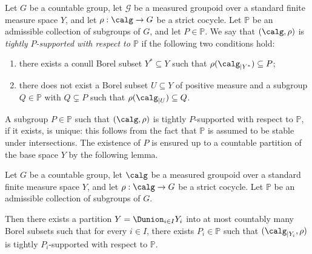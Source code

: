 \begin{de}
Let $G$ be a countable group, let $\mathcal{G}$ be a measured groupoid over a standard finite measure space $Y$, and let $\rho:\calg\to G$ be a strict cocycle. Let $\mathbb{P}$ be an admissible collection of subgroups of $G$, and let $P\in\mathbb{P}$. We say that $(\calg,\rho)$ is \emph{tightly $P$-supported with respect to $\mathbb{P}$} if the following two conditions hold:
\begin{enumerate}
\item there exists a conull Borel subset $Y^*\subseteq Y$ such that $\rho(\calg_{|Y^*})\subseteq P$;
\item there does not exist a Borel subset $U\subseteq Y$ of positive measure and a subgroup $Q\in\mathbb{P}$ with $Q\subsetneq P$ such that $\rho(\calg_{|U})\subseteq Q$.
\end{enumerate}
\end{de}

A subgroup $P\in\mathbb{P}$ such that $(\calg,\rho)$ is tightly $P$-supported with respect to $\mathbb{P}$, if it exists, is unique: this follows from the fact that $\mathbb{P}$ is assumed to be stable under intersections. The existence of $P$ is ensured up to a countable partition of the base space $Y$ by the following lemma.

\begin{lemma}\label{lemma:support}
Let $G$ be a countable group, let $\calg$ be a measured groupoid over a standard finite measure space $Y$, and let $\rho:\calg\to G$ be a strict cocycle. Let $\mathbb{P}$ be an admissible collection of subgroups of $G$.

Then there exists a partition $Y=\Dunion_{i\in I}Y_i$ into at most countably many Borel subsets such that for every $i\in I$, there exists $P_i\in\mathbb{P}$ such that $(\calg_{|Y_i},\rho)$ is tightly $P_i$-supported with respect to $\mathbb{P}$.
\end{lemma}

